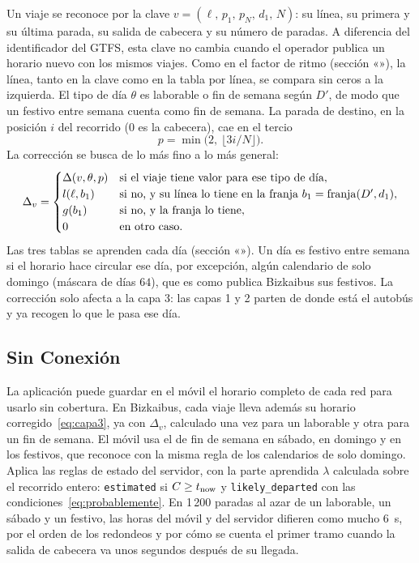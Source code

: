 Un viaje se reconoce por la clave $v=(\ell,\,p_1,\,p_N,\,d_1,\,N)$: su línea, su primera y su última parada, su
salida de cabecera y su número de paradas. A diferencia del identificador del GTFS, esta clave no cambia cuando el
operador publica un horario nuevo con los mismos viajes. Como en el factor de ritmo (sección «»), la
línea, tanto en la clave como en la tabla por línea, se compara sin ceros a la izquierda. El tipo de día $\theta$ es
laborable o fin de semana según $D'$, de modo que un festivo entre semana cuenta como fin de semana. La parada de destino, en la posición $i$ del
recorrido (0 es la cabecera), cae en el tercio
\begin{equation}
\label{eq:tercio}
p=\min\big(2,\ \lfloor 3i/N\rfloor\big).
\end{equation}
La corrección se busca de lo más fino a lo más general:
\begin{equation}
\label{eq:correccion-viaje}
\Delta_v=\begin{cases}
\Delta(v,\theta,p) & \text{si el viaje tiene valor para ese tipo de día},\\
l(\ell,b_1) & \text{si no, y su línea lo tiene en la franja } b_1=\operatorname{franja}(D',d_1),\\
g(b_1) & \text{si no, y la franja lo tiene},\\
0 & \text{en otro caso.}
\end{cases}
\end{equation}
Las tres tablas se aprenden cada día (sección «»). Un día es festivo entre semana si el
horario hace circular ese día, por excepción, algún calendario de solo domingo (máscara de días $64$), que es como
publica Bizkaibus sus festivos. La corrección solo afecta a la capa 3: las capas 1 y 2 parten de donde está el autobús
y ya recogen lo que le pasa ese día.

\subsection{Sin Conexión}
\label{sec:sin-conexion}

La aplicación puede guardar en el móvil el horario completo de cada red para usarlo sin cobertura. En Bizkaibus, cada
viaje lleva además su horario corregido~\eqref{eq:capa3}, ya con $\Delta_v$, calculado una vez para un laborable y otra
para un fin de semana. El móvil usa el de fin de semana en sábado, en domingo y en los festivos, que reconoce con la
misma regla de los calendarios de solo domingo. Aplica las reglas de estado del servidor, con la parte aprendida
$\lambda$ calculada sobre el recorrido entero: \texttt{estimated} si $C\ge t_{\mathrm{now}}$ y \texttt{likely\_departed} con las
condiciones~\eqref{eq:probablemente}. En 1\,200 paradas al azar de un laborable, un sábado y un festivo, las horas del
móvil y del servidor difieren como mucho 6~s, por el orden de los redondeos y por cómo se cuenta el primer tramo
cuando la salida de cabecera va unos segundos después de su llegada.

